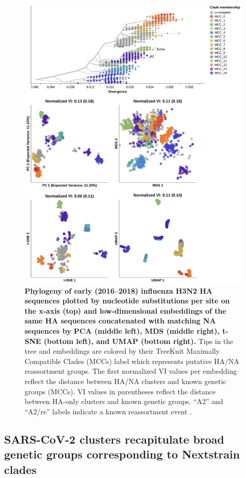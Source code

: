 \documentclass[webpdf,contemporary,large,single]{oup-authoring-template}%
\theoremstyle{thmstyleone}%
\theoremstyle{thmstyletwo}%
\theoremstyle{thmstylethree}%
\begin{document}
\begin{figure}[!h]
\includegraphics[width=0.9\columnwidth]{figures/flu-2016-2018-ha-na-embeddings-by-mcc.png}
\caption{{\bf Phylogeny of early (2016--2018) influenza H3N2 HA sequences plotted by nucleotide substitutions per site on the x-axis (top) and low-dimensional embeddings of the same HA sequences concatenated with matching NA sequences by PCA (middle left), MDS (middle right), t-SNE (bottom left), and UMAP (bottom right).}
  Tips in the tree and embeddings are colored by their TreeKnit Maximally Compatible Clades (MCCs) label which represents putative HA/NA reassortment groups.
  The first normalized VI values per embedding reflect the distance between HA/NA clusters and known genetic groups (MCCs).
  VI values in parentheses reflect the distance between HA-only clusters and known genetic groups.
  ``A2'' and ``A2/re'' labels indicate a known reassortment event \citep{Potter2019}.
}
\label{fig:seasonal-influenza-h3n2-ha-na-2016-2018-embeddings}
\end{figure}

\subsection{SARS-CoV-2 clusters recapitulate broad genetic groups corresponding to Nextstrain clades}
\end{document}
